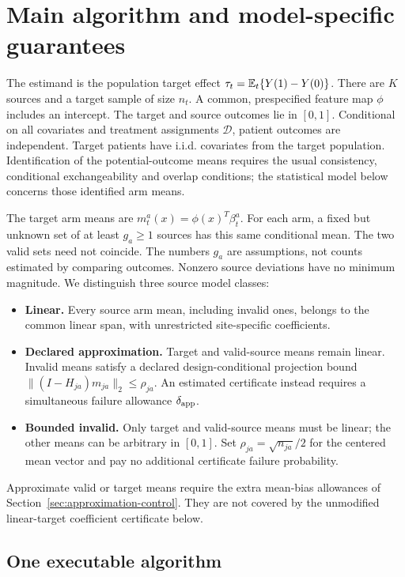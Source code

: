 \section{Main algorithm and model-specific guarantees}
\label{sec:main-guarantee}

The estimand is the population target effect $\tau_t=\mathbb E_t\{Y(1)-Y(0)\}$.
There are $K$ sources and a target sample of size $n_t$. A common, prespecified
feature map $\phi$ includes an intercept. The target and source outcomes lie
in $[0,1]$. Conditional on all covariates and treatment assignments
$\mathcal D$, patient outcomes are independent. Target patients have i.i.d.
covariates from the target population. Identification of the potential-outcome
means requires the usual consistency, conditional exchangeability and overlap
conditions; the statistical model below concerns those identified arm means.

The target arm means are $m_t^a(x)=\phi(x)^T\beta_t^a$. For each arm, a fixed
but unknown set of at least $g_a\ge1$ sources has this same conditional mean.
The two valid sets need not coincide. The numbers $g_a$ are assumptions, not
counts estimated by comparing outcomes. Nonzero source deviations have no
minimum magnitude. We distinguish three source model classes:
\begin{itemize}
\item \textbf{Linear.} Every source arm mean, including invalid ones, belongs to the
common linear span, with unrestricted site-specific coefficients.
\item \textbf{Declared approximation.} Target and valid-source means remain linear.
Invalid means satisfy a declared design-conditional projection bound
$\|(I-H_{ja})m_{ja}\|_2\le\rho_{ja}$. An estimated certificate instead
requires a simultaneous failure allowance $\delta_{\rm app}$.
\item \textbf{Bounded invalid.} Only target and valid-source means must be linear;
the other means can be arbitrary in $[0,1]$. Set
$\rho_{ja}=\sqrt{n_{ja}}/2$ for the centered mean vector and pay no additional
certificate failure probability.
\end{itemize}
Approximate valid or target means require the extra mean-bias allowances of
Section~\ref{sec:approximation-control}. They are not covered by the unmodified
linear-target coefficient certificate below.

\subsection{One executable algorithm}

